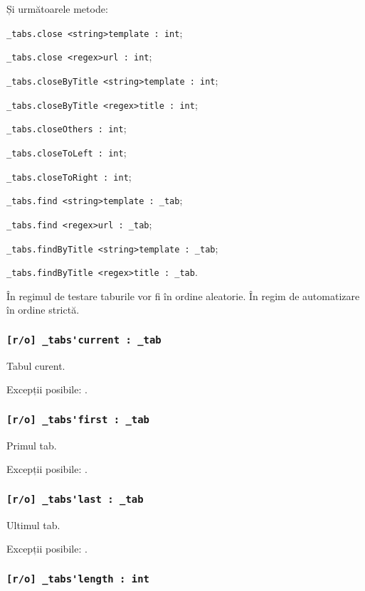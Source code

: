 Și următoarele metode:
\begin{icItems}
	\item \lstinline|_tabs.close <string>template : int|;
	\item \lstinline|_tabs.close <regex>url : int|;
	\item \lstinline|_tabs.closeByTitle <string>template : int|;
	\item \lstinline|_tabs.closeByTitle <regex>title : int|;
	\item \lstinline|_tabs.closeOthers : int|;
	\item \lstinline|_tabs.closeToLeft : int|;
	\item \lstinline|_tabs.closeToRight : int|;
	\item \lstinline|_tabs.find <string>template : _tab|;
	\item \lstinline|_tabs.find <regex>url : _tab|;
	\item \lstinline|_tabs.findByTitle <string>template : _tab|;
	\item \lstinline|_tabs.findByTitle <regex>title : _tab|.
\end{icItems}

În regimul de testare taburile vor fi în ordine aleatorie. În regim de automatizare în ordine strictă.

\subsubsection{\lstinline|[r/o] _tabs'current : _tab|}

Tabul curent.

Excepții posibile: .

\subsubsection{\lstinline|[r/o] _tabs'first : _tab|}

Primul tab.

Excepții posibile: .

\subsubsection{\lstinline|[r/o] _tabs'last : _tab|}

Ultimul tab.

Excepții posibile: .

\subsubsection{\lstinline|[r/o] _tabs'length : int|}

